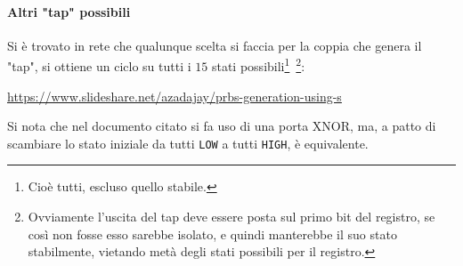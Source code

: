 \documentclass[a4paper,10pt]{article}
\def\code#1{\texttt{#1}}
\begin{document}
\paragraph{Altri "tap" possibili} Si è trovato in rete che qualunque scelta si faccia per la coppia che genera il "tap", si ottiene un ciclo su tutti i $15$ stati possibili\footnote{Cioè tutti, escluso quello stabile.}~\footnote{Ovviamente l'uscita del tap deve essere posta sul primo bit del registro, se così non fosse esso sarebbe isolato, e quindi manterebbe il suo stato stabilmente, vietando metà degli stati possibili per il registro.}:
\newline

\href{https://www.slideshare.net/azadajay/prbs-generation-using-s}{https://www.slideshare.net/azadajay/prbs-generation-using-s}
\newline

\noindent Si nota che nel documento citato si fa uso di una porta XNOR, ma, a patto di scambiare lo stato iniziale da tutti \code{LOW} a tutti \code{HIGH}, è equivalente.
\end{document}
